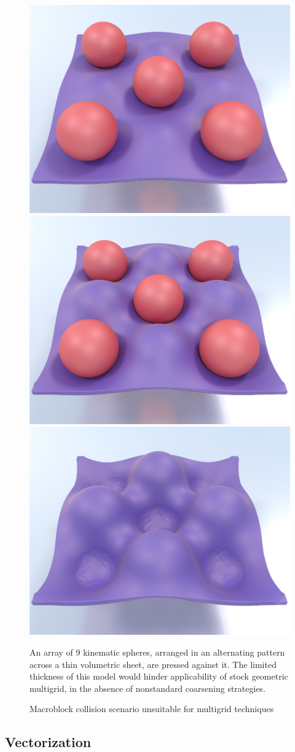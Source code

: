  \begin{figure}[t!] \begin{center} \includegraphics[width=.32\textwidth]{chapter_macroblocks/images/nineballs1.png} \includegraphics[width=.32\textwidth]{chapter_macroblocks/images/nineballs2.png} \includegraphics[width=.32\textwidth]{chapter_macroblocks/images/nineballs3.png} \end{center}
   \caption{Macroblock collision scenario unsuitable for multigrid
     techniques}{An array of 9 kinematic spheres, arranged in an
     alternating pattern across a thin volumetric sheet, are pressed
     against it. The limited thickness of this model would hinder
     applicability of stock geometric multigrid, in the absence of
     nonstandard coarsening strategies.}
    \label{fig:macroblocks:nineballs-example} \end{figure}

\subsection{Vectorization}
\label{sec:macroblocks:vectorization}

